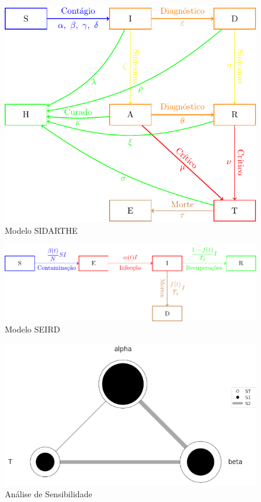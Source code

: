 \documentclass{article}
\begin{document}
\begin{figure}[H]
    \centering
    \includegraphics[page = 1]{Tikz - PDF/Tikz2.pdf}
    \caption{Modelo SIDARTHE}
    \label{sidarthe}
\end{figure}

\begin{figure}[H]
    \centering
    \includegraphics[page = 1]{Tikz - PDF/Tikz3.pdf}
    \caption{Modelo SEIRD}
    \label{seird}
\end{figure}

\begin{figure}[H]
    \centering
    \includegraphics[scale = 0.7]{Imagens/sensibilidade.png}
    \caption{Análise de Sensibilidade}
    \label{sensibilidade}
\end{figure}
\end{document}
